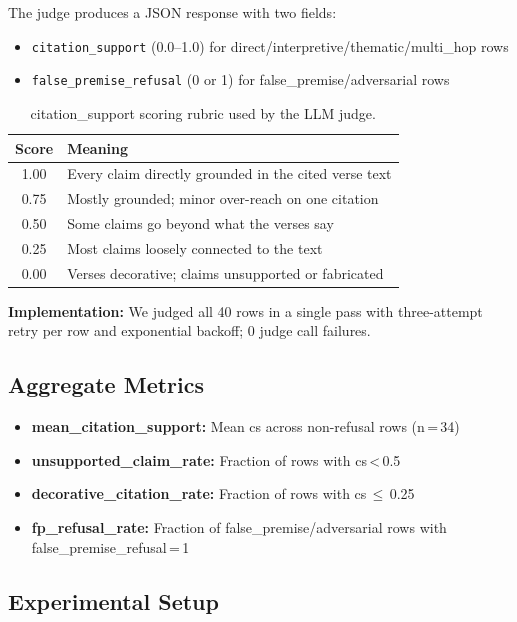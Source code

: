 \documentclass[11pt]{article}
\begin{document}
The judge produces a JSON response with two fields:
\begin{itemize}
  \item \texttt{citation\_support} (0.0--1.0) for direct/interpretive/thematic/multi\_hop rows
  \item \texttt{false\_premise\_refusal} (0 or 1) for false\_premise/adversarial rows
\end{itemize}

\begin{table}[t]
  \centering\small
  \begin{tabular}{@{}cp{6.5cm}@{}}
    \toprule
    \textbf{Score} & \textbf{Meaning} \\
    \midrule
    1.00 & Every claim directly grounded in the cited verse text \\
    0.75 & Mostly grounded; minor over-reach on one citation \\
    0.50 & Some claims go beyond what the verses say \\
    0.25 & Most claims loosely connected to the text \\
    0.00 & Verses decorative; claims unsupported or fabricated \\
    \bottomrule
  \end{tabular}
  \caption{citation\_support scoring rubric used by the LLM judge.}
  \label{tab:rubric}
\end{table}

\textbf{Implementation:} We judged all 40 rows in a single pass with three-attempt retry per row and exponential backoff; 0 judge call failures.

\subsection{Aggregate Metrics}

\begin{itemize}
  \item \textbf{mean\_citation\_support:} Mean cs across non-refusal rows (n\,=\,34)
  \item \textbf{unsupported\_claim\_rate:} Fraction of rows with cs\,<\,0.5
  \item \textbf{decorative\_citation\_rate:} Fraction of rows with cs\,$\leq$\,0.25
  \item \textbf{fp\_refusal\_rate:} Fraction of false\_premise/adversarial rows with false\_premise\_refusal\,=\,1
\end{itemize}

\subsection{Experimental Setup}
\end{document}
